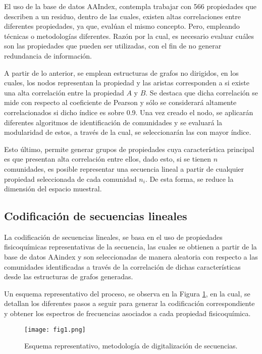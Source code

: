 El uso de la base de datos AAIndex, contempla trabajar con 566 propiedades que describen a un residuo, dentro de las cuales, existen altas correlaciones entre diferentes propiedades, ya que, evalúan el mismo concepto. Pero, empleando técnicas o metodologías diferentes. Razón por la cual, es necesario evaluar cuáles son las propiedades que pueden ser utilizadas, con el fin de no generar redundancia de información.

A partir de lo anterior, se emplean estructuras de grafos no dirigidos, en los cuales, los nodos representan la propiedad y las aristas corresponden a si existe una alta correlación entre la propiedad $A$ y $B$. Se destaca que dicha correlación se mide con respecto al coeficiente de Pearson y sólo se considerará altamente correlacionados si dicho índice es sobre 0.9. Una vez creado el nodo, se aplicarán diferentes algoritmos de identificación de comunidades y se evaluará la modularidad de estos, a través de la cual, se seleccionarán las con mayor índice.

Esto último, permite generar grupos de propiedades cuya característica principal es que presentan alta correlación entre ellos, dado esto, si se tienen $n$ comunidades, es posible representar una secuencia lineal a partir de cualquier propiedad seleccionada de cada comunidad $n_i$. De esta forma, se reduce la dimensión del espacio muestral.

\subsection{Codificación de secuencias lineales}

La codificación de secuencias lineales, se basa en el uso de propiedades fisicoquímicas representativas de la secuencia, las cuales se obtienen a partir de la base de datos AAindex\cite{Kawashima2000} y son seleccionadas de manera aleatoria con respecto a las comunidades identificadas a través de la correlación de dichas características desde las estructuras de grafos generadas.

Un esquema representativo del proceso, se observa en la Figura \ref{cap3:fig1}, en la cual, se detallan los diferentes pasos a seguir para generar la codificación correspondiente y obtener los espectros de frecuencias asociados a cada propiedad fisicoquímica.

\begin{figure}[!h]
	
	\centering
	\texttt{[image: fig1.png]}
	\caption{Esquema representativo, metodología de digitalización de secuencias.}
	\label{cap3:fig1}
\end{figure}

